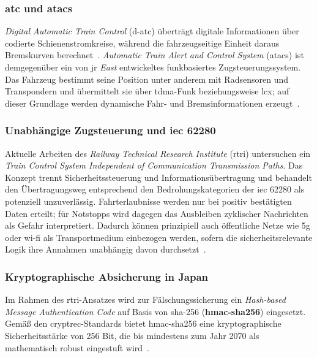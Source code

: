 \documentclass[runningheads]{res/llncs}
\begin{document}
\subsubsection{\texorpdfstring{\gls{atc} und \gls{atacs}}{ATC und ATACS}}
\label{sec:ATC_und_ATACS}
\textit{Digital Automatic Train Control} (\gls{d-atc}) überträgt digitale Informationen über codierte Schienenstromkreise, während die fahrzeugseitige Einheit daraus Bremskurven berechnet~\cite{h.tsukisawaStandardization2024}. \textit{Automatic Train Alert and Control System} (\gls{atacs}) ist demgegenüber ein von \gls{jr} \textit{East} entwickeltes funkbasiertes Zugsteuerungssystem. Das Fahrzeug bestimmt seine Position unter anderem mit Radsensoren und Transpondern und übermittelt sie über \gls{tdma}-Funk beziehungsweise \gls{lcx}; auf dieser Grundlage werden dynamische Fahr- und Bremsinformationen erzeugt~\parencite[S. 13--14]{xiangliuCyber2020}.

\subsubsection{\texorpdfstring{Unabhängige Zugsteuerung und \gls{iec} 62280}{Unabhängige Zugsteuerung und IEC 62280}}
\label{sec:Unabhängige_Zugsteuerung_und_IEC_62280}
Aktuelle Arbeiten des \textit{Railway Technical Research Institute} (\gls{rtri}) untersuchen ein \textit{Train Control System Independent of Communication Transmission Paths}. Das Konzept trennt Sicherheitssteuerung und Informationsübertragung und behandelt den Übertragungsweg entsprechend den Bedrohungskategorien der \gls{iec} 62280 als potenziell unzuverlässig. Fahrterlaubnisse werden nur bei positiv bestätigten Daten erteilt; für Notstopps wird dagegen das Ausbleiben zyklischer Nachrichten als Gefahr interpretiert. Dadurch können prinzipiell auch öffentliche Netze wie \gls{5g} oder \gls{wi-fi} als Transportmedium einbezogen werden, sofern die sicherheitsrelevante Logik ihre Annahmen unabhängig davon durchsetzt~\parencite{iwamotoTrain2024}. 

\subsubsection{Kryptographische Absicherung in Japan}
\label{sec:Kryptographische_Absicherung_in_Japan}
Im Rahmen des \gls{rtri}-Ansatzes wird zur Fälschungssicherung 
ein \textit{Hash-based Message Authentication Code} auf Basis von \gls{sha-256} (\textbf{\gls{hmac-sha256}}) eingesetzt. Gemäß den \gls{cryptrec}-Standards bietet \gls{hmac-sha256} eine kryptographische Sicherheitsstärke von 256 Bit, die bis mindestens zum Jahr 2070 als mathematisch robust eingestuft wird~\parencite[S. 19--20]{iwamotoTrain2024}. 
\end{document}
